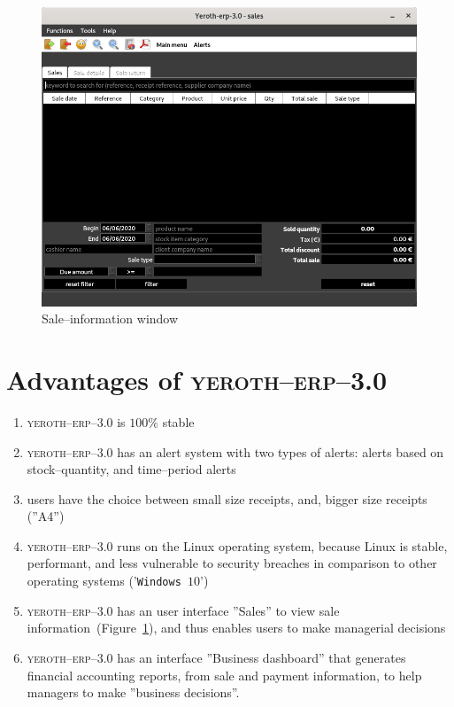 \documentclass[a4paper, 10pt, twocolumn]{article}
\newcommand{\yeren}{\textsc{yeroth--erp--3.0}\xspace}
\begin{document}
\begin{figure}[!htbp]
\centering
\includegraphics[scale=0.32]{../../francais/images/yeren-window-sale-information.png}
\caption{Sale--information window}
\label{fig:fenetre-de-la-vente}
\end{figure}


\section{Advantages of \yeren}

\begin{enumerate}[1)]
	\itemsep -0.3em
	\item \yeren is $100\%$ stable

	\item \yeren has an alert system with two types of alerts:
	      alerts based on stock--quantity, and time--period alerts

	\item users have the choice between small size receipts,
	      and, bigger size receipts (''A4'')

	\item \yeren runs on the Linux operating system,
	      because Linux is stable, performant, and less
	      vulnerable to security breaches in comparison
	      to other operating systems ('\texttt{Windows~$10$}')

	\item \yeren has an user interface ''Sales'' to view
		  sale information~(Figure~\ref{fig:fenetre-de-la-vente}),
		  and thus enables users to make managerial decisions

	\item \yeren has an interface ''Business dashboard'' that
		  generates financial accounting reports,
		  from sale and payment information, to help
		  managers to make ''business decisions''.
\end{enumerate}
\end{document}

